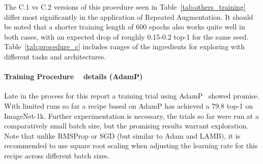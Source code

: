 The C.1 vs C.2 versions of this procedure seen in Table~\ref{tab:others_training} differ most significantly in the application of Repeated Augmentation. It should be noted that a shorter training length of 600 epochs also works quite well in both cases, with an expected drop of roughly 0.15-0.2 top-1 for the same seed. Table~\ref{tab:procedure_c} includes ranges of the ingredients for exploring with different tasks and architectures.



\begin{table}[p]
\centering
{}
\smallskip
\caption{Procedure \Cp~ summary 
\label{tab:procedure_c}}
\end{table}

\paragraph{Training Procedure \Dp ~ details (AdamP)}

Late in the process for this report a training trial using AdamP~\cite{adamp} showed promise. With limited runs so far a recipe based on AdamP has achieved a 79.8 top-1 on ImageNet-1k. Further experimentation is necessary, the trials so far were run at a comparatively small batch size, but the promising results warrant exploration. Note that unlike RMSProp or SGD (but similar to Adam and LAMB), it is recommended to use square root scaling when adjusting the learning rate for this recipe across different batch sizes.

